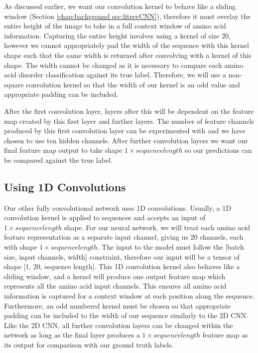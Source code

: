 \documentclass{l4proj}
\begin{document}
As discussed earlier, we want our convolution kernel to behave like a sliding window (Section \ref{chap:background sec:litrevCNN}), therefore it must overlay the entire height of the image to take in a full context window of amino acid information. Capturing the entire height involves using a kernel of size 20, however we cannot appropriately pad the width of the sequence with this kernel shape such that the same width is returned after convolving with a kernel of this shape. The width cannot be changed as it is necessary to compare each amino acid disorder classification against its true label. Therefore, we will use a non-square convolution kernel so that the width of our kernel is an odd value and appropriate padding can be included. 

After the first convolution layer, layers after this will be dependent on the feature map created by this first layer and further layers. The number of feature channels produced by this first convolution layer can be experimented with and we have chosen to use ten hidden channels. After further convolution layers we want our final feature map output to take shape $1\times sequence length$ so our predictions can be compared against the true label. 

\subsection*{Using 1D Convolutions}

Our other fully convolutional network uses 1D convolutions. Usually, a 1D convolution kernel is applied to sequences and accepts an input of $1\times sequence length$ shape. For our neural network, we will treat each amino acid feature representation as a separate input channel, giving us 20 channels, each with shape $1\times sequence length$. The input to the model must follow the [batch size, input channels, width] constraint, therefore our input will be a tensor of shape [1, 20, sequence length]. This 1D convolution kernel also behaves like a sliding window, and a kernel will produce one output feature map which represents all the amino acid input channels. This ensures all amino acid information is captured for a context window at each position along the sequence. Furthermore, an odd numbered kernel must be chosen so that appropriate padding can be included to the width of our sequence similarly to the 2D CNN. Like the 2D CNN, all further convolution layers can be changed within the network as long as the final layer produces a $1\times sequence length$ feature map as its output for comparison with our ground truth labels.
\end{document}

